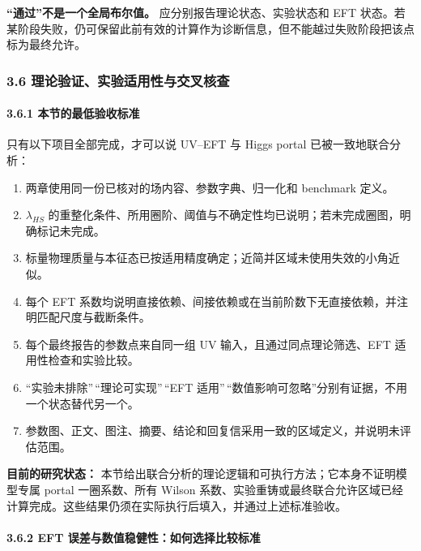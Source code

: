 \documentclass[
  chinese,
  UTF8]{ctexart}
\providecommand{\tightlist}{%
  \setlength{\itemsep}{0pt}\setlength{\parskip}{0pt}}
\begin{document}
\textbf{``通过''不是一个全局布尔值。} 应分别报告理论状态、实验状态和 EFT
状态。若某阶段失败，仍可保留此前有效的计算作为诊断信息，但不能越过失败阶段把该点标为最终允许。

\subsubsection{3.6 理论验证、实验适用性与交叉核查}\label{major-2-step-6}

\paragraph{3.6.1
本节的最低验收标准}\label{ux672cux8282ux7684ux6700ux4f4eux9a8cux6536ux6807ux51c6}

只有以下项目全部完成，才可以说 UV--EFT 与 Higgs portal
已被一致地联合分析：

\begin{enumerate}
\def\labelenumi{\arabic{enumi}.}
\tightlist
\item
  两章使用同一份已核对的场内容、参数字典、归一化和 benchmark 定义。
\item
  \(\lambda_{HS}\)
  的重整化条件、所用圈阶、阈值与不确定性均已说明；若未完成圈图，明确标记未完成。
\item
  标量物理质量与本征态已按适用精度确定；近简并区域未使用失效的小角近似。
\item
  每个 EFT
  系数均说明直接依赖、间接依赖或在当前阶数下无直接依赖，并注明匹配尺度与截断条件。
\item
  每个最终报告的参数点来自同一组 UV 输入，且通过同点理论筛选、EFT
  适用性检查和实验比较。
\item
  ``实验未排除''\,``理论可实现''\,``EFT
  适用''\,``数值影响可忽略''分别有证据，不用一个状态替代另一个。
\item
  参数图、正文、图注、摘要、结论和回复信采用一致的区域定义，并说明未评估范围。
\end{enumerate}

\textbf{目前的研究状态：}
本节给出联合分析的理论逻辑和可执行方法；它本身不证明模型专属 portal
一圈系数、所有 Wilson
系数、实验重铸或最终联合允许区域已经计算完成。这些结果仍须在实际执行后填入，并通过上述标准验收。

\paragraph{3.6.2 EFT
误差与数值稳健性：如何选择比较标准}\label{eft-ux8befux5deeux4e0eux6570ux503cux7a33ux5065ux6027ux5982ux4f55ux9009ux62e9ux6bd4ux8f83ux6807ux51c6}
\end{document}
